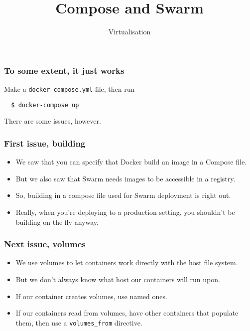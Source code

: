 \documentclass[10pt]{beamer}
\title{Compose and Swarm}
\author[I720]{Virtualisation}
\institute[Otago Polytechnic]{
  Otago Polytechnic \\
  Dunedin, New Zealand \\
}
\date{}
\begin{document}
\begin{frame}[plain]
  \titlepage
\end{frame}

\begin{frame}[fragile]
  \frametitle{To some extent, it just works}
  
  Make a \texttt{docker-compose.yml} file, then run
  
  \begin{verbatim}
  $ docker-compose up
   \end{verbatim}
   
   There are some issues, however.
\end{frame}

\begin{frame}
  \frametitle{First issue, building}
   
   \begin{itemize}
     \item We saw that you can specify that Docker build an image in a Compose file.
     \item But we also saw that Swarm needs images to be accessible in a registry.
     \item So, building in a compose file used for Swarm deployment is right out.
     \item Really, when you're deploying to a production setting, you shouldn't be building on the fly anyway.
   \end{itemize}
\end{frame}

\begin{frame}
  \frametitle{Next issue, volumes}
   
   \begin{itemize}
     \item We use volumes to let containers work directly with the host file system.
     \item But we don't always know what host our containers will run upon.
     \item If our container creates volumes, use named ones.
     \item If our containers read from volumes, have other containers that populate them, then use a \texttt{volumes\_from} directive.
   \end{itemize}
\end{frame}
\end{document}
